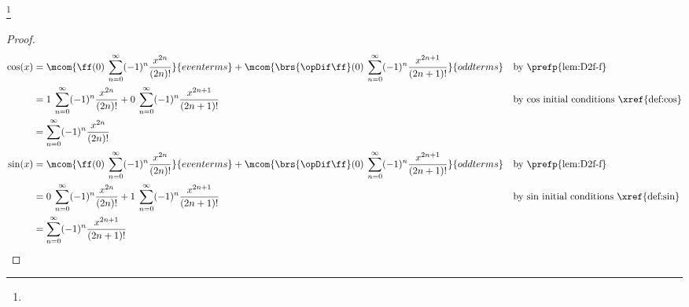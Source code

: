 \begin{theorem}
\footnote{
  }
\label{thm:cos_taylor}
\label{thm:sin_taylor}
\end{theorem}
\begin{proof}
\begin{align*}
  \cos(x)
    &= \mcom{\ff(0)\:\sum_{n=0}^\infty (-1)^n \frac{x^{2n}}{(2n)!}     }{even terms}
     + \mcom{\brs{\opDif\ff}(0)\:\sum_{n=0}^\infty (-1)^n \frac{x^{2n+1}}{(2n+1)!} }{odd terms}
    && \text{by \prefp{lem:D2f-f}}
  \\&= 1\:\sum_{n=0}^\infty (-1)^n \frac{x^{2n}}{(2n)!}
     + 0\:\sum_{n=0}^\infty (-1)^n \frac{x^{2n+1}}{(2n+1)!}
    && \text{by $\cos$ initial conditions \xref{def:cos}}
  \\&= \sum_{n=0}^\infty (-1)^n \frac{x^{2n}}{(2n)!} 
  \\
  \sin(x)
    &= \mcom{\ff(0)\:\sum_{n=0}^\infty (-1)^n \frac{x^{2n}}{(2n)!}     }{even terms}
     + \mcom{\brs{\opDif\ff}(0)\:\sum_{n=0}^\infty (-1)^n \frac{x^{2n+1}}{(2n+1)!} }{odd terms}
    && \text{by \prefp{lem:D2f-f}}
  \\&= 0\:\sum_{n=0}^\infty (-1)^n \frac{x^{2n}}{(2n)!}
     + 1\:\sum_{n=0}^\infty (-1)^n \frac{x^{2n+1}}{(2n+1)!}
    && \text{by $\sin$ initial conditions \xref{def:sin}}
  \\&= \sum_{n=0}^\infty (-1)^n \frac{x^{2n+1}}{(2n+1)!}
\end{align*}
\end{proof}


